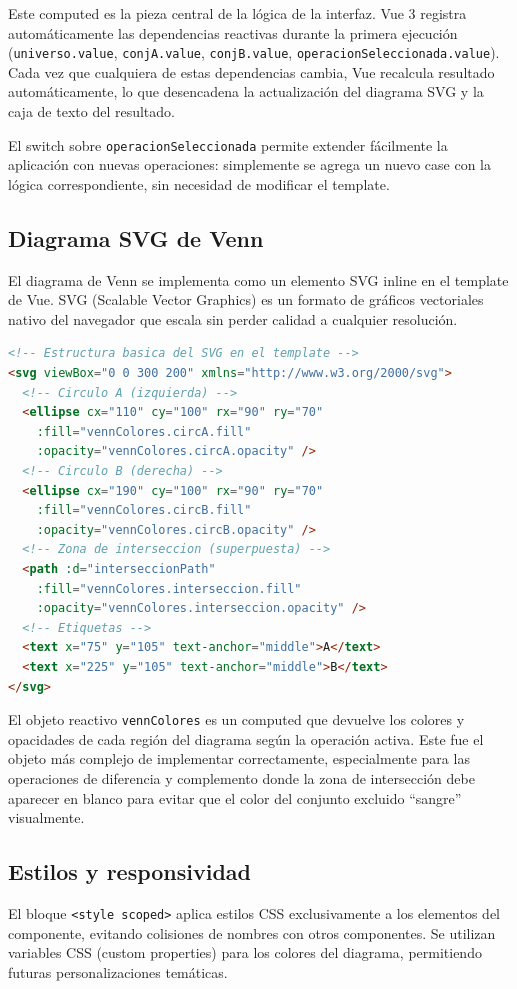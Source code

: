 \documentclass[11pt,a4paper]{article}
\begin{document}
Este computed es la pieza central de la lógica de la interfaz. Vue 3 registra automáticamente las dependencias reactivas durante la primera ejecución (\texttt{universo.value}, \texttt{conjA.value}, \texttt{conjB.value}, \texttt{operacionSeleccionada.value}). Cada vez que cualquiera de estas dependencias cambia, Vue recalcula resultado automáticamente, lo que desencadena la actualización del diagrama SVG y la caja de texto del resultado.

El switch sobre \texttt{operacionSeleccionada} permite extender fácilmente la aplicación con nuevas operaciones: simplemente se agrega un nuevo case con la lógica correspondiente, sin necesidad de modificar el template.

\subsection{Diagrama SVG de Venn}
El diagrama de Venn se implementa como un elemento SVG inline en el template de Vue. SVG (Scalable Vector Graphics) es un formato de gráficos vectoriales nativo del navegador que escala sin perder calidad a cualquier resolución.

\begin{lstlisting}[language=HTML, caption={Estructura básica del SVG en el template}]
<!-- Estructura basica del SVG en el template -->
<svg viewBox="0 0 300 200" xmlns="http://www.w3.org/2000/svg">
  <!-- Circulo A (izquierda) -->
  <ellipse cx="110" cy="100" rx="90" ry="70"
    :fill="vennColores.circA.fill"
    :opacity="vennColores.circA.opacity" />
  <!-- Circulo B (derecha) -->
  <ellipse cx="190" cy="100" rx="90" ry="70"
    :fill="vennColores.circB.fill"
    :opacity="vennColores.circB.opacity" />
  <!-- Zona de interseccion (superpuesta) -->
  <path :d="interseccionPath"
    :fill="vennColores.interseccion.fill"
    :opacity="vennColores.interseccion.opacity" />
  <!-- Etiquetas -->
  <text x="75" y="105" text-anchor="middle">A</text>
  <text x="225" y="105" text-anchor="middle">B</text>
</svg>
\end{lstlisting}

El objeto reactivo \texttt{vennColores} es un computed que devuelve los colores y opacidades de cada región del diagrama según la operación activa. Este fue el objeto más complejo de implementar correctamente, especialmente para las operaciones de diferencia y complemento donde la zona de intersección debe aparecer en blanco para evitar que el color del conjunto excluido ``sangre'' visualmente.

\subsection{Estilos y responsividad}
El bloque \texttt{<style scoped>} aplica estilos CSS exclusivamente a los elementos del componente, evitando colisiones de nombres con otros componentes. Se utilizan variables CSS (custom properties) para los colores del diagrama, permitiendo futuras personalizaciones temáticas.
\end{document}
